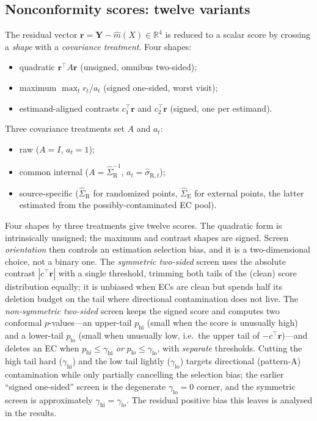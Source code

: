 \documentclass[11pt]{article}
\newcommand{\R}{\mathrm{R}}
\newcommand{\E}{\mathrm{E}}
\begin{document}
\subsection{Nonconformity scores: twelve variants}

The residual vector $\bm r=\bm Y-\widehat m(X)\in\mathbb R^4$ is reduced to a scalar score by crossing a \emph{shape} with a \emph{covariance treatment}. Four shapes:
\begin{itemize}
    \item quadratic $\bm r^{\top}A\bm r$ (unsigned, omnibus two-sided);
    \item maximum $\max_t r_t/a_t$ (signed one-sided, worst visit);
    \item estimand-aligned contrasts $c_1^{\top}\bm r$ and $c_2^{\top}\bm r$ (signed, one per estimand).
\end{itemize}
Three covariance treatments set $A$ and $a_t$:
\begin{itemize}
    \item raw ($A=I$, $a_t=1$);
    \item common internal ($A=\widehat\Sigma_{\R}^{-1}$, $a_t=\widehat\sigma_{\R,t}$);
    \item source-specific ($\widehat\Sigma_{\R}$ for randomized points, $\widehat\Sigma_{\E}$ for external points, the latter estimated from the possibly-contaminated EC pool).
\end{itemize}
Four shapes by three treatments give twelve scores. The quadratic form is intrinsically unsigned; the maximum and contrast shapes are signed. Screen \emph{orientation} then controls an estimation selection bias, and it is a two-dimensional choice, not a binary one. The \emph{symmetric two-sided} screen uses the absolute contrast $|c^{\top}\bm r|$ with a single threshold, trimming both tails of the (clean) score distribution equally; it is unbiased when ECs are clean but spends half its deletion budget on the tail where directional contamination does not live. The \emph{non-symmetric two-sided} screen keeps the signed score and computes two conformal $p$-values---an upper-tail $p_{\mathrm{hi}}$ (small when the score is unusually high) and a lower-tail $p_{\mathrm{lo}}$ (small when unusually low, i.e.\ the upper tail of $-c^{\top}\bm r$)---and deletes an EC when $p_{\mathrm{hi}}\le\gamma_{\mathrm{hi}}$ \emph{or} $p_{\mathrm{lo}}\le\gamma_{\mathrm{lo}}$, with \emph{separate} thresholds. Cutting the high tail hard ($\gamma_{\mathrm{hi}}$) and the low tail lightly ($\gamma_{\mathrm{lo}}$) targets directional (pattern-A) contamination while only partially cancelling the selection bias; the earlier ``signed one-sided'' screen is the degenerate $\gamma_{\mathrm{lo}}{=}0$ corner, and the symmetric screen is approximately $\gamma_{\mathrm{hi}}{=}\gamma_{\mathrm{lo}}$. The residual positive bias this leaves is analysed in the results.
\end{document}
